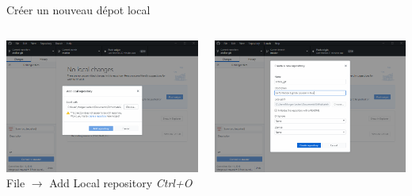 \documentclass{beamer}
\begin{document}
\begin{frame}{Créer un nouveau dépot local}
    \begin{columns}
        \begin{column}{.5\textwidth}
            \includegraphics[width=\textwidth]{img/add_repo.png}
            \\
            {\small File $\rightarrow$ Add Local repository \emph{Ctrl+O}} 
        \end{column}
        \begin{column}{.5\textwidth}
            \includegraphics[width=\textwidth]{img/create_local_repo.png}
            \\
            $ $
        \end{column}
    \end{columns}
\end{frame}
\end{document}
